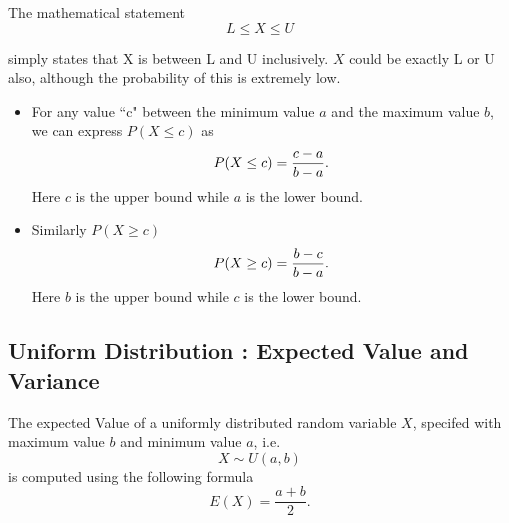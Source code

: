 \documentclass[a4paper,12pt]{article}
\begin{document}
The mathematical statement
\[L \leq X \leq U\]

simply states that X is between L and U inclusively. $X$ could be exactly L or U also, although the probability of this is extremely low.


\begin{itemize}
	
	\item For any value ``c" between the minimum value $a$ and the maximum
	value $b$, we can express $P(X \leq c)$ as
	\[P(X \leq c) = {c-a \over b-a}.\]
	Here $c$ is the upper bound while $a$ is the lower bound.
	\item Similarly $P(X \geq c)$ \[P(X \geq c) = {b-c \over b-a}.\]
	Here $b$ is the upper bound while $c$ is the lower bound.
\end{itemize}










\subsection*{Uniform Distribution : Expected Value and Variance}
The expected Value of a uniformly distributed random variable $X$, specifed with maximum value $b$ and minimum value $a$, i.e.
\[ X \sim U(a,b) \] is computed using the following formula
\[ E(X) = \frac{a+b}{2}. \]
\end{document}
